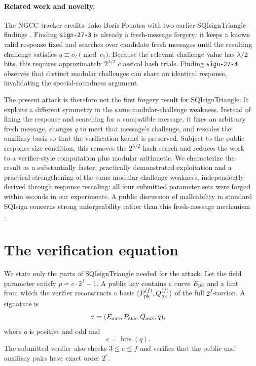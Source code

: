 \documentclass[11pt,a4paper]{article}
\newcommand{\bits}{\operatorname{bits}}
\begin{document}
\paragraph{Related work and novelty.}
The NGCC tracker credits Tako Boris Fouotsa with two earlier SQIsignTriangle
findings \cite{ngcc-tracker}. Finding \texttt{sign-27-3} is already a
fresh-message forgery: it keeps a known valid response fixed and searches over
candidate fresh messages until the resulting challenge satisfies
$q\equiv c_2\pmod{c_1}$. Because the relevant challenge value has
$\lambda/2$ bits, this requires approximately $2^{\lambda/2}$ classical hash
trials. Finding \texttt{sign-27-4} observes that distinct modular challenges
can share an identical response, invalidating the special-soundness argument.

The present attack is therefore not the first forgery result for
SQIsignTriangle. It exploits a different symmetry in the same modular-challenge
weakness. Instead of fixing the response and searching for a compatible
message, it fixes an arbitrary fresh message, changes $q$ to meet that
message's challenge, and rescales the auxiliary basis so that the verification
kernel is preserved. Subject to the public response-size condition, this
removes the $2^{\lambda/2}$ hash search and reduces the work to a
verifier-style computation plus modular arithmetic. We characterize the result
as a substantially faster, practically demonstrated exploitation and a
practical strengthening of the same modular-challenge weakness, independently
derived through response rescaling: all four submitted parameter sets were
forged within seconds in our experiments. A public discussion of malleability
in standard SQIsign concerns strong unforgeability rather than this
fresh-message mechanism \cite{sqisign-suf}.

\section{The verification equation}

We state only the parts of SQIsignTriangle needed for the attack. Let the
field parameter satisfy $p=c\mathbin{\cdot}2^f-1$. A public key contains a curve
$E_{\rm pk}$ and a hint from which the verifier reconstructs a basis
$(P^{(f)}_{\rm pk},Q^{(f)}_{\rm pk})$ of the full $2^f$-torsion. A signature is
\begin{equation}
           \sigma=(E_{\rm aux},P_{\rm aux},Q_{\rm aux},q),
  \label{eq:sig}
\end{equation}
where $q$ is positive and odd and
\begin{equation}
                         e=\bits(q).
  \label{eq:e}
\end{equation}
The submitted verifier also checks $3\le e\le f$ and verifies that the public
and auxiliary pairs have exact order $2^e$.
\end{document}
